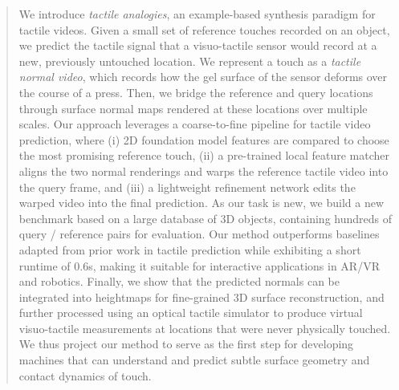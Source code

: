 \begin{abstract}
We introduce \emph{tactile analogies}, an example-based synthesis paradigm for tactile videos.
Given a small set of reference touches recorded on an object, we predict the tactile signal that
a visuo-tactile sensor would record at a new, previously untouched location. 
We represent a touch as a \emph{tactile normal video}, which records how the gel surface of the
sensor deforms over the course of a press. 
Then, we bridge the reference and query locations through surface normal maps rendered at these locations over multiple scales. 
Our approach leverages a coarse-to-fine pipeline for tactile video prediction, where (i) 2D foundation model features are compared  
to choose the most promising reference touch, (ii) a pre-trained local feature matcher aligns the two normal renderings and warps
the reference tactile video into the query frame, and (iii) a lightweight refinement network edits the warped video into the final prediction. 
As our task is new, we build a new benchmark based on a large database of 3D objects, containing hundreds of query / reference pairs for evaluation.
Our method outperforms baselines adapted from prior work in tactile prediction while exhibiting a short runtime of 0.6s, making it suitable for interactive applications in AR/VR and robotics.
Finally, we show that the predicted normals can be integrated into heightmaps for fine-grained 3D surface reconstruction,
and further processed using an optical tactile simulator to produce virtual visuo-tactile measurements at
locations that were never physically touched.
We thus project our method to serve as the first step for developing machines that can understand and 
predict subtle surface geometry and contact dynamics of touch.
\end{abstract}
